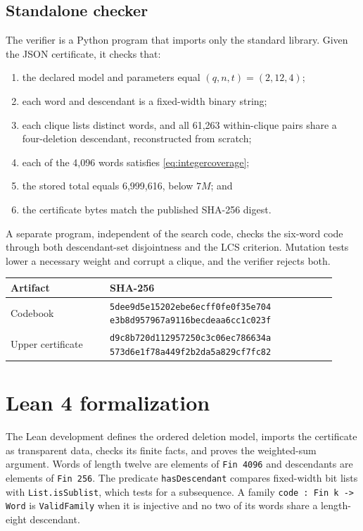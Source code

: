 \documentclass[11pt]{article}
\theoremstyle{definition}
\begin{document}
\subsection{Standalone checker}

The verifier is a Python program that imports only the standard library.
Given the JSON certificate, it checks that:
\begin{enumerate}[leftmargin=2.2em]
  \item the declared model and parameters equal $(q,n,t)=(2,12,4)$;
  \item each word and descendant is a fixed-width binary string;
  \item each clique lists distinct words, and all 61,263 within-clique pairs
        share a four-deletion descendant, reconstructed from scratch;
  \item each of the 4,096 words satisfies \eqref{eq:integercoverage};
  \item the stored total equals 6,999,616, below $7M$; and
  \item the certificate bytes match the published SHA-256 digest.
\end{enumerate}

A separate program, independent of the search code, checks the six-word code
through both descendant-set disjointness and the LCS criterion.  Mutation
tests lower a necessary weight and corrupt a clique, and the verifier rejects
both.

\begin{center}
\begin{tabular}{@{}p{0.28\linewidth}p{0.64\linewidth}@{}}
\toprule
Artifact & SHA-256\\
\midrule
Codebook &
\texttt{\footnotesize 5dee9d5e15202ebe6ecff0fe0f35e704}\newline
\texttt{\footnotesize e3b8d957967a9116becdeaa6cc1c023f}\\[0.4em]
Upper certificate &
\texttt{\footnotesize d9c8b720d112957250c3c06ec786634a}\newline
\texttt{\footnotesize 573d6e1f78a449f2b2da5a829cf7fc82}\\
\bottomrule
\end{tabular}
\end{center}

\section{Lean 4 formalization}

The Lean development defines the ordered deletion model, imports the
certificate as transparent data, checks its finite facts, and proves the
weighted-sum argument.  Words of length twelve are elements of
\lstinline|Fin 4096| and descendants are elements of \lstinline|Fin 256|.
The predicate \lstinline|hasDescendant| compares fixed-width bit lists with
\lstinline|List.isSublist|, which tests for a subsequence.  A family
\lstinline|code : Fin k -> Word| is \lstinline|ValidFamily| when it is injective
and no two of its words share a length-eight descendant.
\end{document}
